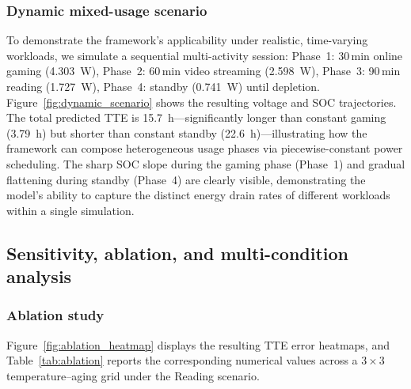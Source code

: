 \documentclass[5p,times,number]{elsarticle}
\newcommand{\figref}[1]{\hyperref[#1]{\textup{Figure~\ref*{#1}}}}
\newcommand{\tabref}[1]{\hyperref[#1]{\textup{Table~\ref*{#1}}}}
\def\figref#1{Figure~\ref{#1}}
\def\tabref#1{Table~\ref{#1}}
\begin{document}
\subsubsection{Dynamic mixed-usage scenario}\label{sec:dynamic}
To demonstrate the framework's applicability under realistic, time-varying workloads, we simulate a sequential multi-activity session:
Phase~1: 30\,min online gaming (\SI{4.303}{\watt}),
Phase~2: 60\,min video streaming (\SI{2.598}{\watt}),
Phase~3: 90\,min reading (\SI{1.727}{\watt}),
Phase~4: standby (\SI{0.741}{\watt}) until depletion.
\figref{fig:dynamic_scenario} shows the resulting voltage and SOC trajectories.
The total predicted TTE is \SI{15.7}{\hour}---significantly longer than constant gaming (\SI{3.79}{\hour}) but shorter than constant standby (\SI{22.6}{\hour})---illustrating how the framework can compose heterogeneous usage phases via piecewise-constant power scheduling.
The sharp SOC slope during the gaming phase (Phase~1) and gradual flattening during standby (Phase~4) are clearly visible, demonstrating the model's ability to capture the distinct energy drain rates of different workloads within a single simulation.


\subsection{Sensitivity, ablation, and multi-condition analysis}\label{sec:multi_analysis}
\subsubsection{Ablation study}\label{sec:ablation}
\figref{fig:ablation_heatmap} displays the resulting TTE error heatmaps, and \tabref{tab:ablation} reports the corresponding numerical values across a $3 \times 3$ temperature--aging grid under the Reading scenario.
\end{document}
